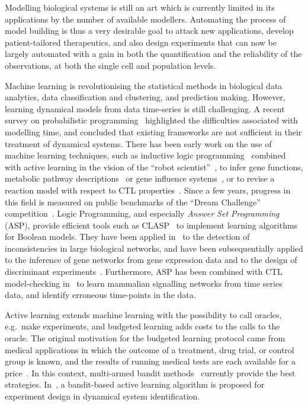 \documentclass{llncs}
\begin{document}
Modelling biological systems is still an art which is currently limited in its applications by the number of available modellers.
Automating the process of model building is thus a very desirable goal
to attack new applications, develop patient-tailored therapeutics,
and also design experiments that can now be largely automated
with a gain in both the quantification and the reliability of the observations, at both the single cell and population levels.

Machine learning is revolutionising the statistical methods in biological data analytics,
data classification and clustering, and prediction making.
However, learning dynamical models from data time-series is still challenging.
A recent survey on probabilistic programming~\cite{GHNR14fose}
highlighted the difficulties associated with modelling time,
and concluded that existing frameworks are not sufficient in their treatment of dynamical systems.
There has been early work on the use of machine learning techniques, such as inductive
 logic programming~\cite{Muggleton95ngc} combined with active learning in the vision of the ``robot scientist''~\cite{BMOKRK01etai},
to infer gene functions,
metabolic pathway descriptions~\cite{AM02etai,AM02slps}
or gene influence systems~\cite{BCRG04jtb},
or to revise a reaction model with respect to CTL properties~\cite{CCFS06tcsb}.
Since a few years, progress in this field is measured on public benchmarks
of the ``Dream Challenge'' competition~\cite{Hill16nm,Meyer14bmc}.
Logic Programming, and especially \emph{Answer Set Programming} (ASP), provide efficient tools such as CLASP~\cite{GKNS07lpnmr}
to implement learning algorithms for Boolean models.
They have been applied in~\cite{GSTUV08iclp} to the detection of  inconsistencies in large biological networks,
and have been subsequentially applied to the inference of gene networks from gene expression data and to the design of discriminant experiments~\cite{VKASSSG15frontiers}.
Furthermore, ASP has been combined with CTL model-checking in~\cite{OPSSG16biosystems} to learn mammalian signalling networks from time series data,
and identify erroneous time-points in the data.

Active learning extends machine learning with the possibility to call oracles, e.g.~make experiments,
and budgeted learning adds costs to the calls to the oracle.
The original motivation for the budgeted learning protocol came from medical applications in which the outcome of a treatment,
drug trial, or control group is known, and the results of running medical tests are each available for a price~\cite{DZBSM13ml}.
In this context, multi-armed bandit methods~\cite{DBSSZ07icdm} currently provide the best strategies.
In~\cite{LMALS14ecml}, a bandit-based active learning algorithm is proposed for experiment design in dynamical system identification.
\end{document}
